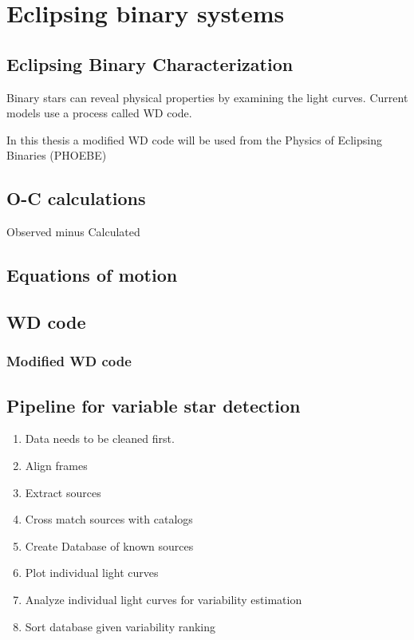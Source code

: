 \chapter{Eclipsing binary systems}

\section{Eclipsing Binary Characterization}
Binary stars can reveal physical properties by examining the light curves.
Current models use a process called WD code.

In this thesis a modified WD code will be used from the Physics of Eclipsing Binaries (PHOEBE)

\section{O-C calculations}
Observed minus Calculated

\section{Equations of motion}

\section{WD code}
\subsection{Modified WD code}

\section{Pipeline for variable star detection}
\begin{enumerate}
    \item Data needs to be cleaned first.
    \item Align frames
    \item Extract sources
    \item Cross match sources with catalogs
    \item Create Database of known sources
    \item Plot individual light curves
    \item Analyze individual light curves for variability estimation
    \item Sort database given variability ranking
\end{enumerate}

